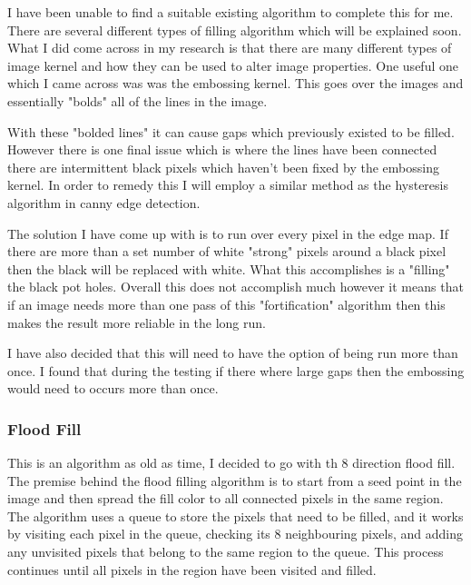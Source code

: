 \begin{FlushLeft}
    I have been unable to find a suitable existing algorithm to complete this for me. There are several different types of filling algorithm which will be explained soon. What I did come across in my research is that there are many different types of image kernel and how they can be used to alter image properties. One useful one which I came across was was the embossing kernel. This goes over the images and essentially "bolds" all of the lines in the image. \\ \bk

    With these "bolded lines" it can cause gaps which previously existed to be filled. However there is one final issue which is where the lines have been connected there are intermittent black pixels which haven't been fixed by the embossing kernel. In order to remedy this I will employ a similar method as the hysteresis algorithm in canny edge detection. \\ \bk
    
    The solution I have come up with is to run over every pixel in the edge map. If there are more than a set number of white "strong" pixels around a black pixel then the black will be replaced with white. What this accomplishes is a "filling" the black pot holes. Overall this does not accomplish much however it means that if an image needs more than one pass of this "fortification" algorithm then this makes the result more reliable in the long run. \\ \bk

    I have also decided that this will need to have the option of being run more than once. I found that during the testing if there where large gaps then the embossing would need to occurs more than once.\\
    \bk

    \subsubsection{Flood Fill}
    This is an algorithm as old as time, I decided to go with th 8 direction flood fill. The premise behind the flood filling algorithm is to start from a seed point in the image and then spread the fill color to all connected pixels in the same region. The algorithm uses a queue to store the pixels that need to be filled, and it works by visiting each pixel in the queue, checking its 8 neighbouring pixels, and adding any unvisited pixels that belong to the same region to the queue. This process continues until all pixels in the region have been visited and filled. \\ \bk


\end{FlushLeft}

